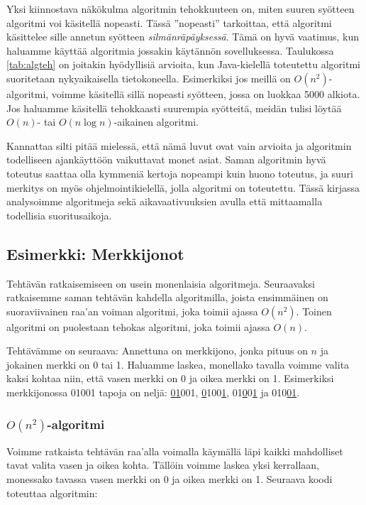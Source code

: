 Yksi kiinnostava näkökulma algoritmin tehokkuuteen on,
miten suuren syötteen algoritmi voi käsitellä nopeasti.
Tässä ''nopeasti'' tarkoittaa, että algoritmi käsittelee
sille annetun syötteen \emph{silmänräpäyksessä}.
Tämä on hyvä vaatimus, kun haluamme käyttää algoritmia
jossakin käytännön sovelluksessa.
Taulukossa \ref{tab:algteh} on joitakin hyödyllisiä arvioita,
kun Java-kielellä toteutettu
algoritmi suoritetaan nykyaikaisella tietokoneella.
Esimerkiksi jos meillä on $O(n^2)$-algoritmi, voimme käsitellä sillä
nopeasti syötteen, jossa on luokkaa 5000 alkiota.
Jos haluamme käsitellä tehokkaasti suurempia syötteitä,
meidän tulisi löytää $O(n)$- tai $O(n \log n)$-aikainen algoritmi.

Kannattaa silti pitää mielessä, että nämä luvut ovat vain arvioita ja algoritmin
todelliseen ajankäyttöön vaikuttavat monet asiat.
Saman algoritmin hyvä toteutus saattaa olla
kymmeniä kertoja nopeampi kuin huono toteutus,
ja suuri merkitys on myös ohjelmointikielellä,
jolla algoritmi on toteutettu.
Tässä kirjassa analysoimme algoritmeja sekä aikavaativuuksien
avulla että mittaamalla todellisia suoritusaikoja.

\subsection{Esimerkki: Merkkijonot}

Tehtävän ratkaisemiseen on usein monenlaisia algoritmeja.
Seuraavaksi ratkaisemme saman tehtävän kahdella algoritmilla,
joista ensimmäinen on suoraviivainen raa'an voiman
algoritmi, joka toimii ajassa $O(n^2)$.
Toinen algoritmi on puolestaan tehokas algoritmi,
joka toimii ajassa $O(n)$.

Tehtävämme on seuraava: Annettuna on merkkijono,
jonka pituus on $n$ ja jokainen merkki on 0 tai 1.
Haluamme laskea, monellako tavalla voimme valita kaksi kohtaa
niin, että vasen merkki on 0 ja oikea merkki on 1.
Esimerkiksi merkkijonossa 01001 tapoja on neljä:
\underline{01}001, \underline{0}100\underline{1},
01\underline{0}0\underline{1} ja 010\underline{01}.

\subsubsection{$O(n^2)$-algoritmi}

Voimme ratkaista tehtävän raa'alla voimalla
käymällä läpi kaikki mahdolliset tavat valita vasen ja oikea kohta.
Tällöin voimme laskea yksi kerrallaan,
monessako tavassa vasen merkki on 0 ja oikea merkki on 1.
Seuraava koodi toteuttaa algoritmin:

